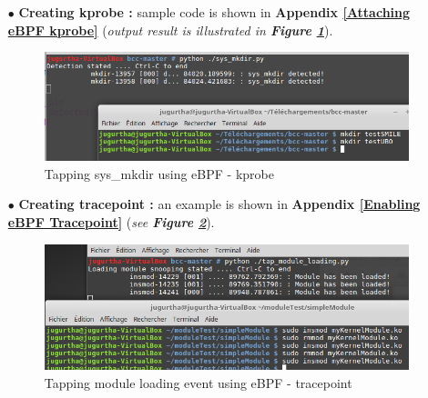 \begin{itemize}
	\item[$\bullet$] \textbf{Creating kprobe : } sample code is shown in \textbf{\color{red}Appendix {\color{blue}\ref{Attaching eBPF kprobe}}} (\textit{output result is illustrated in \textbf{Figure \ref{Tapping sys-mkdir using eBPF}}}).	
					\begin{figure}[H]
						\centering
        				\includegraphics[scale=0.4]{img/solution/sys_mkdir_detected.png}
        				\caption{Tapping sys\_mkdir using eBPF - kprobe}
        				\label{Tapping sys-mkdir using eBPF}
    				\end{figure}	
	
	
	\item[$\bullet$] \textbf{Creating tracepoint : } an example is shown in \textbf{\color{red}Appendix {\color{blue}\ref{Enabling eBPF Tracepoint}}} 	 (\textit{see \textbf{Figure \ref{Tapping module loading event using eBPF - tracepoint}}}).	
	
					\begin{figure}[H]
						\centering
        				\includegraphics[scale=0.4]{img/solution/creating-ebpf-tracepoint.png}
        				\caption{Tapping module loading event using eBPF - tracepoint}
        				\label{Tapping module loading event using eBPF - tracepoint}
    				\end{figure}		
	
	
\end{itemize}

\begin{center}
\end{center}


